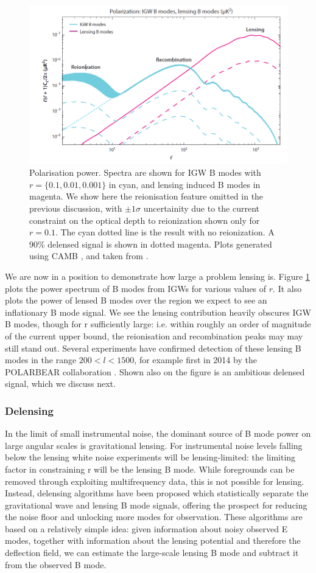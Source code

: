 \documentclass[a4paper,10pt]{article}
\begin{document}
\begin{figure}[h]
  \includegraphics[width=0.7\linewidth]{lensingfucksus.png}
  \centering
  \caption{Polarisation power. Spectra are shown for IGW B modes with $r=\{0.1,0.01,0.001\}$ in cyan, and lensing induced B modes in magenta. We show here the reionisation feature omitted in the previous discussion, with $\pm1\sigma$ uncertainity due to the current constraint on the optical depth to reionization shown only for $r=0.1$. The cyan dotted line is the result with no reionization. A 90\% delensed signal is shown in dotted magenta. Plots generated using CAMB \cite{CAMBInfo}, and taken from \cite{QBM}.}
  \label{lensingisfucked}
\end{figure}

We are now in a position to demonstrate how large a problem lensing is. Figure \ref{lensingisfucked} plots the power spectrum of B modes from IGWs for various values of $r$. It also plots the power of lensed B modes over the region we expect to see an inflationary B mode signal. We see the lensing contribution heavily obscures IGW B modes, though for r sufficiently large: i.e. within roughly an order of magnitude of the current upper bound, the reionisation and recombination peaks may may still stand out. Several experiments have confirmed detection of these lensing B modes in the range $200<l<1500$, for example first in 2014 by the POLARBEAR collaboration \cite{polarbear}. Shown also on the figure is an ambitious delensed signal, which we discuss next.

\subsubsection{Delensing}

In the limit of small instrumental noise, the dominant source of B mode power on large angular scales is gravitational lensing. For instrumental noise levels falling below the lensing white noise experiments will be lensing-limited: the limiting factor in constraining r will be the lensing B mode. While foregrounds can be removed through exploiting multifrequency data, this is not possible for lensing. Instead, delensing algorithms have been proposed  which statistically separate the gravitational wave and lensing B mode signals, offering the prospect for reducing the noise floor and unlocking more modes for observation. These algorithms are based on a relatively simple idea: given information about noisy observed E modes, together with information about the lensing potential and therefore the deflection field, we can estimate the large-scale lensing B mode and subtract it from the observed B mode.\\
\end{document}

